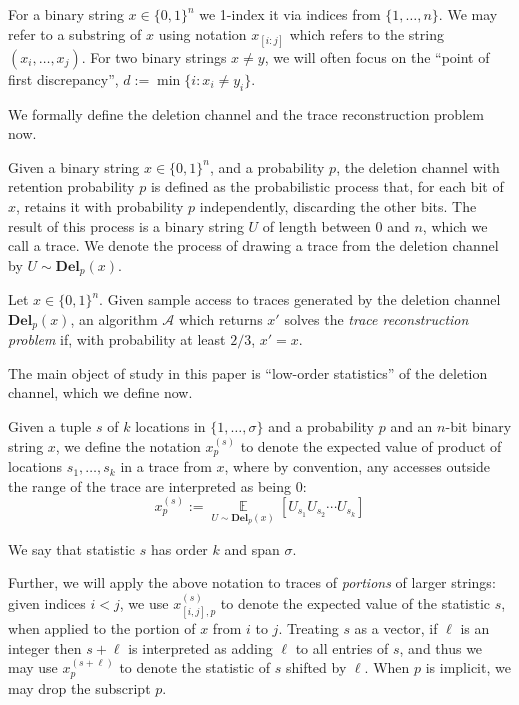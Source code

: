 \documentclass[11pt]{article}
\theoremstyle{plain}
\newcommand{\Del}[2]{\textbf{Del}_{#1}(#2)}
\newcommand{\Exp}{\operatorname*{\mathbb{E}}}
\begin{document}
For a binary string $x\in\{0,1\}^n$ we 1-index it via indices from $\{1,\ldots,n\}$. We may refer to a substring of $x$ using notation $x_{[i:j]}$ which refers to the string $(x_i,\ldots,x_j)$. For two binary strings $x\neq y$, we will often focus on the ``point of first discrepancy'', $d:=\min \{i: x_i\neq y_i\}$.

We formally define the deletion channel and the trace reconstruction problem now.
\begin{definition}
Given a binary string $x\in\{0,1\}^n$, and a probability $p$, the deletion channel with retention probability $p$ is defined as the probabilistic process that, for each bit of $x$, retains it with probability $p$ independently, discarding the other bits. The result of this process is a binary string $U$ of length between 0 and $n$, which we call a trace. We denote the process of drawing a trace from the deletion channel by $U\sim \Del{p}{x}$.
\end{definition}

\begin{definition}
    Let $x \in \{0,1\}^n$. Given sample access to traces generated by the deletion channel $\Del{p}{x}$, an algorithm $\mathcal{A}$ which returns $x'$ solves the \textit{trace reconstruction problem} if, with probability at least $2/3$, $x'=x$. 
\end{definition}

The main object of study in this paper is ``low-order statistics'' of the deletion channel, which we define now.

\begin{definition}\label{def:k-th}
Given a tuple $s$ of $k$ locations in $\{1,\ldots,\sigma\}$ and a probability $p$ and an $n$-bit binary string $x$, we define the notation $x^{(s)}_p$ to denote the expected value of product of locations $s_1,\ldots,s_k$ in a trace from $x$, where by convention, any accesses outside the range of the trace are interpreted as being 0: \[x^{(s)}_p:=\Exp_{U\sim \Del{p}{x}}[U_{s_1}U_{s_2}\cdots U_{s_k}]\]

We say that statistic $s$ has order $k$ and span $\sigma$.

Further, we will apply the above notation to traces of \emph{portions} of larger strings: given indices $i<j$, we use $x_{[i,j],p}^{(s)}$ to denote the expected value of the statistic $s$, when applied to the portion of $x$ from $i$ to $j$. Treating $s$ as a vector, if $\ell$ is an integer then $s+\ell$ is interpreted as adding $\ell$ to all entries of $s$, and thus we may use $x^{(s+\ell)}_p$ to denote the statistic of $s$ shifted by $\ell$. When $p$ is implicit, we may drop the subscript $p$.
\end{definition}
\end{document}
